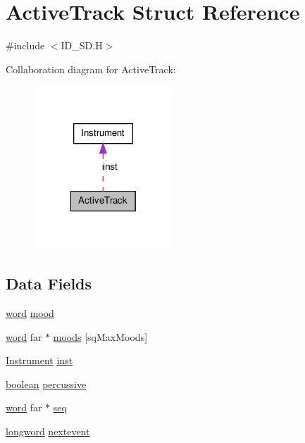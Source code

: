 \hypertarget{structActiveTrack}{
\section{ActiveTrack Struct Reference}
\label{structActiveTrack}
}


{\ttfamily \#include $<$ID\_\-SD.H$>$}



Collaboration diagram for ActiveTrack:
\nopagebreak
\begin{figure}[H]
\begin{center}
\leavevmode
\includegraphics[width=148pt]{structActiveTrack__coll__graph}
\end{center}
\end{figure}
\subsection*{Data Fields}
\begin{DoxyCompactItemize}
\item 
\hyperlink{ID__HEAD_8H_abad51e07ab6d26bec9f1f786c8d65bcd}{word} \hyperlink{structActiveTrack_aaba9b7709da3346226478f057ee65c48}{mood}
\item 
\hyperlink{ID__HEAD_8H_abad51e07ab6d26bec9f1f786c8d65bcd}{word} far $\ast$ \hyperlink{structActiveTrack_a60ead5579aeb16b38995eefb9990913c}{moods} \mbox{[}sqMaxMoods\mbox{]}
\item 
\hyperlink{structInstrument}{Instrument} \hyperlink{structActiveTrack_a2cc1d1ef0b29c5397a1ed9e631517456}{inst}
\item 
\hyperlink{ID__HEAD_8H_a7c6368b321bd9acd0149b030bb8275ed}{boolean} \hyperlink{structActiveTrack_ad0f5656b9be0982f70f033ef383ec7aa}{percussive}
\item 
\hyperlink{ID__HEAD_8H_abad51e07ab6d26bec9f1f786c8d65bcd}{word} far $\ast$ \hyperlink{structActiveTrack_a37559e9209b8049a20b0d508ec18b4e5}{seq}
\item 
\hyperlink{ID__HEAD_8H_a8a9a7dd50c6fdb45dcdf0eb929479663}{longword} \hyperlink{structActiveTrack_a5f40ea505c14c688124600762ff101f4}{nextevent}
\end{DoxyCompactItemize}



